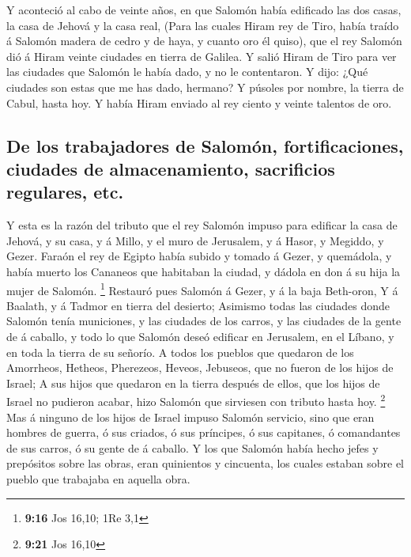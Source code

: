  Y aconteció al cabo de veinte años, en que Salomón había
edificado las dos casas, la casa de Jehová y la casa real, 
(Para las cuales Hiram rey de Tiro, había traído á Salomón madera de
cedro y de haya, y cuanto oro él quiso), que el rey Salomón dió á Hiram
veinte ciudades en tierra de Galilea.  Y salió Hiram de
Tiro para ver las ciudades que Salomón le había dado, y no le
contentaron.  Y dijo: ¿Qué ciudades son estas que me has
dado, hermano? Y púsoles por nombre, la tierra de Cabul, hasta hoy.
 Y había Hiram enviado al rey ciento y veinte talentos de
oro.

\hypertarget{de-los-trabajadores-de-salomuxf3n-fortificaciones-ciudades-de-almacenamiento-sacrificios-regulares-etc.}{%
\subsection{De los trabajadores de Salomón, fortificaciones, ciudades de
almacenamiento, sacrificios regulares,
etc.}\label{de-los-trabajadores-de-salomuxf3n-fortificaciones-ciudades-de-almacenamiento-sacrificios-regulares-etc.}}

 Y esta es la razón del tributo que el rey Salomón impuso
para edificar la casa de Jehová, y su casa, y á Millo, y el muro de
Jerusalem, y á Hasor, y Megiddo, y Gezer.  Faraón el rey de
Egipto había subido y tomado á Gezer, y quemádola, y había muerto los
Cananeos que habitaban la ciudad, y dádola en don á su hija la mujer de
Salomón. \footnote{\textbf{9:16} Jos 16,10; 1Re 3,1} 
Restauró pues Salomón á Gezer, y á la baja Beth-oron,  Y á
Baalath, y á Tadmor en tierra del desierto;  Asimismo todas
las ciudades donde Salomón tenía municiones, y las ciudades de los
carros, y las ciudades de la gente de á caballo, y todo lo que Salomón
deseó edificar en Jerusalem, en el Líbano, y en toda la tierra de su
señorío.  A todos los pueblos que quedaron de los
Amorrheos, Hetheos, Pherezeos, Heveos, Jebuseos, que no fueron de los
hijos de Israel;  A sus hijos que quedaron en la tierra
después de ellos, que los hijos de Israel no pudieron acabar, hizo
Salomón que sirviesen con tributo hasta hoy. \footnote{\textbf{9:21} Jos
  16,10}  Mas á ninguno de los hijos de Israel impuso
Salomón servicio, sino que eran hombres de guerra, ó sus criados, ó sus
príncipes, ó sus capitanes, ó comandantes de sus carros, ó su gente de á
caballo.  Y los que Salomón había hecho jefes y prepósitos
sobre las obras, eran quinientos y cincuenta, los cuales estaban sobre
el pueblo que trabajaba en aquella obra.

